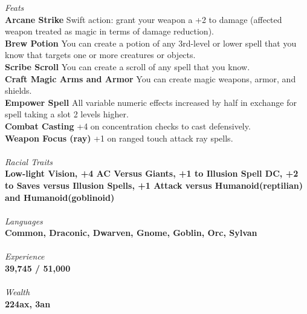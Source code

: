\documentclass[letterpaper]{article}
\newcommand{\e}[1]{\emph{#1}}
\newcommand{\B}[1]{\textbf{#1}}
\begin{document}
\e{Feats} \\
\B{Arcane Strike} Swift action: grant your weapon a +2 to damage (affected weapon treated as magic in terms of damage reduction). \\
\B{Brew Potion} You can create a potion of any 3rd-level or lower spell that you know that targets one or more creatures or objects. \\
\B{Scribe Scroll} You can create a scroll of any spell that you know. \\
\B{Craft Magic Arms and Armor} You can create magic weapons, armor, and shields. \\
\B{Empower Spell} All variable numeric effects increased by half in exchange for spell taking a slot 2 levels higher. \\
\B{Combat Casting} +4 on concentration checks to cast defensively. \\
\B{Weapon Focus (ray)} +1 on ranged touch attack ray spells. \\
\\
\e{Racial Traits} \\
\B{Low-light Vision, +4 AC Versus Giants, +1 to Illusion Spell DC, +2 to Saves versus Illusion Spells, +1 Attack versus Humanoid(reptilian) and Humanoid(goblinoid)} \\
\\
\e{Languages} \\
\B{Common, Draconic, Dwarven, Gnome, Goblin, Orc, Sylvan} \\
\\
{\e{Experience}} \\
\B{39,745 / 51,000} \\
\\
{\e{Wealth}} \\
\B{224ax, 3an} \\
\end{document}
